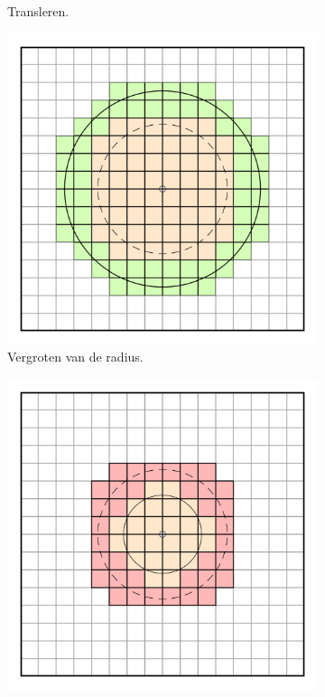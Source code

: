 \begin{figure}[t]
\begin{subfigure}[b]{0.3\textwidth}
    \caption{Transleren.}
    \label{fig:dl-transformaties:translate}
  \end{subfigure}%
  \begin{subfigure}[b]{0.3\textwidth}
    \includegraphics[width=\textwidth]{./img/raw/dl-transformations/scale_up.png}
    \caption{Vergroten van de radius.}
    \label{fig:dl-transformaties:scale-up}
  \end{subfigure}%
  \begin{subfigure}[b]{0.3\textwidth}
    \includegraphics[width=\textwidth]{./img/raw/dl-transformations/scale_down.png}

\end{subfigure}
\end{figure}
